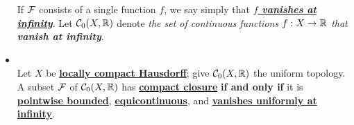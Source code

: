 \documentclass[11pt]{article}
\begin{document}
\begin{itemize}
\begin{definition}
If ${\mathcal F}$ consists of a single function $f$, we say simply that \underline{\emph{\textbf{$f$ vanishes at infinity}}}. Let ${\mathcal C}_0(X, {\mathbb R})$ denote \emph{the set of continuous functions $f : X \rightarrow {\mathbb R}$ that \textbf{vanish at infinity}}.
\end{definition}

\item \begin{corollary} \citep{munkres2000topology}\\
Let $X$ be \underline{\textbf{locally compact Hausdorff}}; give ${\mathcal C}_0(X, {\mathbb R})$ the uniform topology. A subset ${\mathcal F}$ of ${\mathcal C}_0(X, {\mathbb R})$ has \underline{\textbf{compact closure}}  \textbf{if and only if} it is \underline{\textbf{pointwise bounded}}, \underline{\textbf{equicontinuous}}, and \underline{\textbf{vanishes uniformly at infinity}}.
\end{corollary}
\end{itemize}
\end{document}
